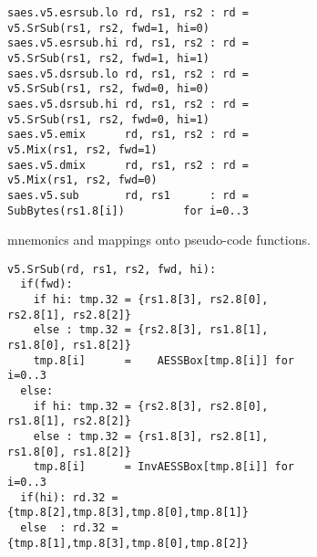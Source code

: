 
%


\begin{figure}[h]
\begin{subfigure}{\textwidth}
\begin{lstlisting}[language=pseudo,style=block]
saes.v5.esrsub.lo rd, rs1, rs2 : rd = v5.SrSub(rs1, rs2, fwd=1, hi=0)
saes.v5.esrsub.hi rd, rs1, rs2 : rd = v5.SrSub(rs1, rs2, fwd=1, hi=1)
saes.v5.dsrsub.lo rd, rs1, rs2 : rd = v5.SrSub(rs1, rs2, fwd=0, hi=0)
saes.v5.dsrsub.hi rd, rs1, rs2 : rd = v5.SrSub(rs1, rs2, fwd=0, hi=1)
saes.v5.emix      rd, rs1, rs2 : rd = v5.Mix(rs1, rs2, fwd=1)
saes.v5.dmix      rd, rs1, rs2 : rd = v5.Mix(rs1, rs2, fwd=0)
saes.v5.sub       rd, rs1      : rd = SubBytes(rs1.8[i])         for i=0..3
\end{lstlisting}
\caption{
 mnemonics and mappings onto pseudo-code functions.
}
\label{fig:mnemonics:v5}
\end{subfigure}
\begin{subfigure}{\textwidth}
\begin{lstlisting}[language=pseudo,style=block]
v5.SrSub(rd, rs1, rs2, fwd, hi):
  if(fwd):
    if hi: tmp.32 = {rs1.8[3], rs2.8[0], rs2.8[1], rs2.8[2]}
    else : tmp.32 = {rs2.8[3], rs1.8[1], rs1.8[0], rs1.8[2]}
    tmp.8[i]      =    AESSBox[tmp.8[i]] for i=0..3
  else:
    if hi: tmp.32 = {rs2.8[3], rs2.8[0], rs1.8[1], rs2.8[2]}
    else : tmp.32 = {rs1.8[3], rs2.8[1], rs1.8[0], rs1.8[2]}
    tmp.8[i]      = InvAESSBox[tmp.8[i]] for i=0..3
  if(hi): rd.32 = {tmp.8[2],tmp.8[3],tmp.8[0],tmp.8[1]}
  else  : rd.32 = {tmp.8[1],tmp.8[3],tmp.8[0],tmp.8[2]}


\end{lstlisting}
\end{subfigure}
\end{figure}
